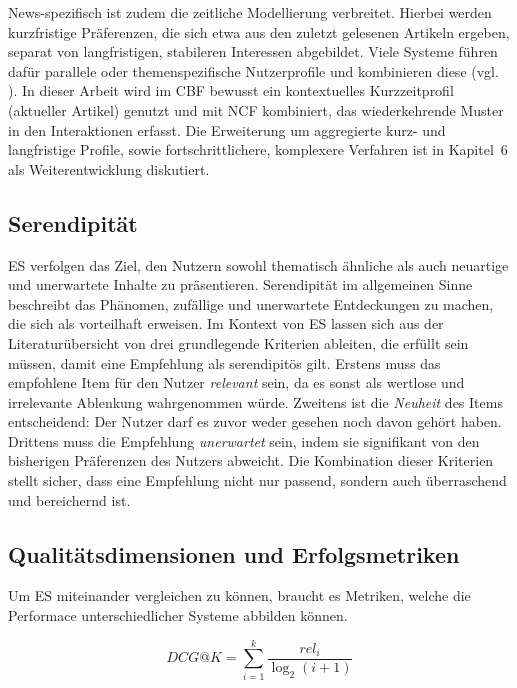 News-spezifisch ist zudem die zeitliche Modellierung verbreitet. Hierbei werden kurzfristige Präferenzen, 
die sich etwa aus den zuletzt gelesenen Artikeln ergeben, separat von langfristigen, stabileren Interessen 
abgebildet. Viele Systeme führen dafür parallele oder themenspezifische Nutzerprofile und kombinieren diese 
(vgl. \cite{Lops_CBRS_SOTA_2011,wu_personalized_2022}). In dieser Arbeit wird im \ac{CBF}
bewusst ein kontextuelles Kurzzeitprofil (aktueller Artikel) genutzt und mit \ac{NCF}
kombiniert, das wiederkehrende Muster in den Interaktionen erfasst. Die Erweiterung um aggregierte kurz- und 
langfristige Profile, sowie fortschrittlichere, komplexere Verfahren ist in Kapitel~6 als Weiterentwicklung diskutiert.

\subsection{Serendipität}
\label{sec:serendipitaet}
\ac{ES} verfolgen das Ziel, den Nutzern sowohl thematisch ähnliche als auch neuartige und 
unerwartete Inhalte zu präsentieren. Serendipität im allgemeinen Sinne beschreibt das Phänomen, 
zufällige und unerwartete Entdeckungen zu machen, die sich als vorteilhaft erweisen. Im Kontext von \ac{ES} 
lassen sich aus der Literaturübersicht von \cite{Kotkov_Serendipity_2016} drei grundlegende Kriterien ableiten, 
die erfüllt sein müssen, damit eine Empfehlung als serendipitös gilt. Erstens muss das empfohlene Item für den Nutzer 
\textit{relevant} sein, da es sonst als wertlose und irrelevante Ablenkung wahrgenommen würde. Zweitens ist die 
\textit{Neuheit} des Items entscheidend: Der Nutzer darf es zuvor weder gesehen noch davon gehört haben. 
Drittens muss die Empfehlung \textit{unerwartet} sein, indem sie signifikant von den bisherigen Präferenzen des 
Nutzers abweicht. Die Kombination dieser Kriterien stellt sicher, dass eine Empfehlung nicht nur passend, 
sondern auch überraschend und bereichernd ist.

\subsection{Qualitätsdimensionen und Erfolgsmetriken}
Um \ac{ES} miteinander vergleichen zu können, braucht es Metriken, welche die Performace unterschiedlicher
Systeme abbilden können. 

\begin{equation}
\label{eq:dcg}
DCG@K=\sum_{i=1}^{k}\frac{rel_{i}}{\log_2(i+1)}
\end{equation}

